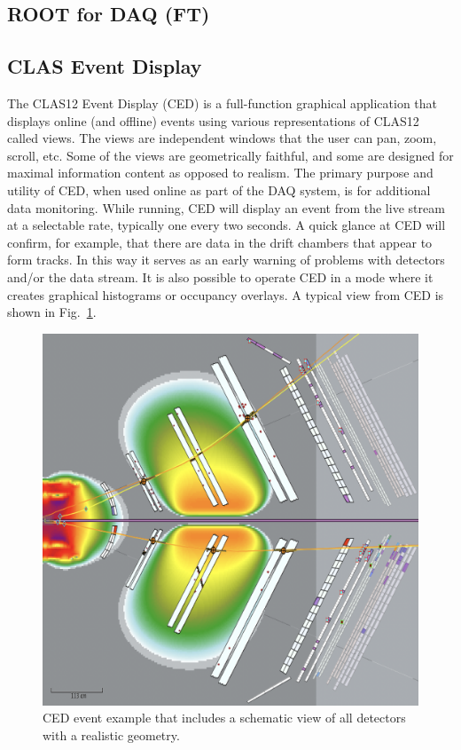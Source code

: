 \subsection{ROOT for DAQ (FT)}




\subsection{CLAS Event Display}

The CLAS12 Event Display (CED) is a full-function graphical application that displays online (and offline) events using various representations of CLAS12 called views. The views are independent windows that the user can pan, zoom, scroll, etc. Some of the views are geometrically faithful, and some are designed for maximal information content as opposed to realism. The primary purpose and utility of CED, when used online as part of the DAQ system, is for additional data monitoring. While running, CED will display an event from the live stream at a selectable rate, typically one every two seconds. A quick glance at CED will confirm, for example, that there are data in the drift chambers that appear to form tracks. In this way it serves as an early warning of problems with detectors and/or the data stream. It is also possible to operate CED in a mode where it creates graphical histograms or occupancy overlays. A typical view from CED is shown in Fig.~\ref{fig:ced}.

\begin{figure}[hbt]
	\centering
	\includegraphics[width=1.0\columnwidth,keepaspectratio]{img/ced.png}
	\caption{CED event example that includes a schematic view of all detectors with a realistic geometry.}
	\label{fig:ced}
\end{figure}
